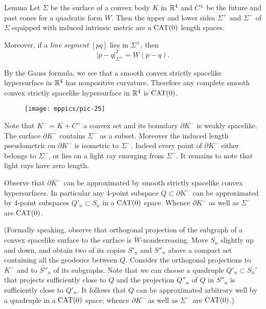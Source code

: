 \documentclass{article}
\begin{document}
\begin{thm}{Lemma}\label{lem:sides}
Let $\Sigma$ be the surface of a convex body $K$ in $\mathbb{R}^4$ and $C^\pm$ be the future and past cones for a quadratic form $W$.
Then the upper and lower sides $\Sigma^+$ and $\Sigma^-$ of $\Sigma$ equipped with induced intrinsic metric are a $\mathrm{CAT}(0)$ length spaces.

Moreover, if a \emph{line segment} $[pq]$ 
lies in $\Sigma^\pm$, then 
\[|p-q|_{\Sigma^\pm}^2=W(p-q).\]

\end{thm}


By the Gauss formula, we see that a smooth convex strictly spacelike hypersurface in $\mathbb{R}^4$ has nonpositive curvature.
Therefore any complete smooth convex strictly spacelike hypersurface in $\mathbb{R}^4$ is $\mathrm{CAT}(0)$.

\begin{wrapfigure}{r}{55mm}
\vskip-0mm
\centering
\texttt{[image: mppics/pic-25]}
\end{wrapfigure}

Note that $K^-=K+C^+$ a convex set and its boundary $\partial K^-$ is weakly spacelike.
The surface $\partial K^-$ contains $\Sigma^-$ as a subset.
Moreover the induced length pseudometric on $\partial K^-$ is isometric to $\Sigma^-$.
Indeed every point of $\partial K^-$ either belongs to  $\Sigma^-$, or lies on a light ray emerging from $\Sigma^-$.
It remains to note that light rays have zero length.

Observe that $\partial K^-$ can be approximated by smooth strictly spacelike convex hypersurfaces.
In particular any 4-point subspace $Q\subset\partial K^-$ can be approximated by 4-point subspaces $Q'_n\subset S_n$ in a $\mathrm{CAT}(0)$ space.
Whence $\partial K^-$ as well as $\Sigma^-$ are $\mathrm{CAT}(0)$.

(Formally speaking, observe that orthogonal projection of the subgraph of a convex spacelike surface to the surface is $W$-nondecreasing.
Move $S_n$ slightly up and down,
and obtain two of its copies $S'_n$ and $S''_n$ above a compact set containing all the geodesics between $Q$.
Consider the orthogonal projections to $K^-$ and to $S''_n$ of its subgraphs.
Note that we can choose a quadruple $Q'_n\subset S_n'$ that projects sufficiently close to $Q$ and the projection $Q''_n$ of $Q$ in $S''_n$ is sufficiently close to $Q'_n$.
It follows that $Q$ can be approximated arbitrary well by a quadruple in a $\mathrm{CAT}(0)$ space; whence $\partial K^-$ as well as $\Sigma^-$ are $\mathrm{CAT}(0)$.)
\end{document}

